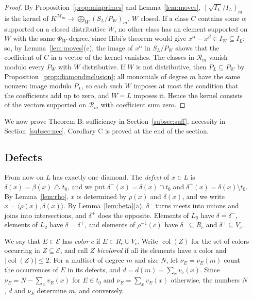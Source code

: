 \documentclass{amsart}
\theoremstyle{definition}
\DeclareMathOperator{\col}{col}
\newcommand{\cE}{\mathcal E}
\newcommand{\dm}{\diamond}
\begin{document}
\begin{proof}
By Proposition~\ref{prop:minprimes} and Lemma~\ref{lem:moves}, $(\sqrt{I_L}/I_L)_m$ is the kernel of $K^{\mathcal M_m}\to\bigoplus_W(S_L/P_W)_m$, $W$ closed. If a class $C$ contains some $\alpha$ supported on a closed distributive $W$, no other class has an element supported on $W$ with the same $\Phi_W$-degree, since Hibi's theorem would give $x^\alpha-x^\beta\in I_W\subseteq I_L$; so, by Lemma~\ref{lem:moves}(c), the image of $x^\alpha$ in $S_L/P_W$ shows that the coefficient of $C$ in a vector of the kernel vanishes. The classes in $\mathcal R_m$ vanish modulo every $P_W$ with $W$ distributive. If $W$ is not distributive, then $P_L\subseteq P_W$ by Proposition~\ref{prop:diamondinclusion}; all monomials of degree $m$ have the same nonzero image modulo $P_L$, so each such $W$ imposes at most the condition that the coefficients add up to zero, and $W=L$ imposes it. Hence the kernel consists of the vectors supported on $\mathcal R_m$ with coefficient sum zero.
\end{proof}

We now prove Theorem B: sufficiency in Section~\ref{subsec:suff}, necessity in Section~\ref{subsec:nec}. Corollary C is proved at the end of the section.

\subsection{Defects}
From now on $L$ has exactly one diamond. The \emph{defect} of $x\in L$ is $\delta(x)=\beta(x)\mathbin{\triangle}t_0$, and we put $\delta^-(x)=\delta(x)\cap t_0$ and $\delta^+(x)=\delta(x)\setminus t_0$. By Lemma~\ref{lem:rho}, $x$ is determined by $\rho(x)$ and $\delta(x)$, and we write $x=\langle\rho(x),\delta(x)\rangle$. By Lemma~\ref{lem:beta}(a), $\delta^-$ turns meets into unions and joins into intersections, and $\delta^+$ does the opposite. Elements of $L_0$ have $\delta=\delta^-$, elements of $L_2$ have $\delta=\delta^+$, and elements of $\rho^{-1}(c)$ have $\delta^-\subseteq R_c$ and $\delta^+\subseteq V_c$.

We say that $E\in\cE$ has \emph{color} $c$ if $E\in R_c\cup V_c$. Write $\col(Z)$ for the set of colors occurring in $Z\subseteq\cE$, and call $Z$ \emph{bicolored} if all its elements have a color and $|\col(Z)|\le2$. For a multiset of degree $m$ and size $N$, let $\nu_E=\nu_E(m)$ count the occurrences of $E$ in its defects, and $d=d(m)=\sum_xv_\dm(x)$. Since $\nu_E=N-\sum_xv_E(x)$ for $E\in t_0$ and $\nu_E=\sum_xv_E(x)$ otherwise, the numbers $N$, $d$ and $\nu_E$ determine $m$, and conversely.
\end{document}
